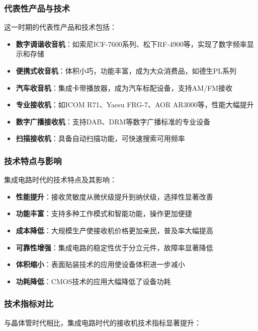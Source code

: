 \documentclass[12pt,UTF8]{ctexbook}
\begin{document}
\subsubsection{代表性产品与技术}

这一时期的代表性产品和技术包括：

\begin{itemize}[leftmargin=3.5em]
    \item \textbf{数字调谐收音机}：如索尼ICF-7600系列、松下RF-4900等，实现了数字频率显示和存储
    \item \textbf{便携式收音机}：体积小巧，功能丰富，成为大众消费品，如德生PL系列
    \item \textbf{汽车收音机}：集成卡带播放器，成为汽车标配设备，支持AM/FM接收
    \item \textbf{专业接收机}：如ICOM R71、Yaesu FRG-7、AOR AR3000等，性能大幅提升
    \item \textbf{数字广播接收机}：支持DAB、DRM等数字广播标准的专业设备
    \item \textbf{扫描接收机}：具备自动扫描功能，可快速搜索可用频率
\end{itemize}

\subsubsection{技术特点与影响}

集成电路时代的技术特点及其影响：

\begin{itemize}[leftmargin=3.5em]
    \item \textbf{性能提升}：接收灵敏度从微伏级提升到纳伏级，选择性显著改善
    \item \textbf{功能丰富}：支持多种工作模式和智能功能，操作更加便捷
    \item \textbf{成本降低}：大规模生产使接收机价格更加亲民，普及率大幅提高
    \item \textbf{可靠性增强}：集成电路的稳定性优于分立元件，故障率显著降低
    \item \textbf{体积缩小}：表面贴装技术的应用使设备体积进一步减小
    \item \textbf{功耗降低}：CMOS技术的应用大幅降低了设备功耗
\end{itemize}

\subsubsection{技术指标对比}

与晶体管时代相比，集成电路时代的接收机技术指标显著提升：
\end{document}
